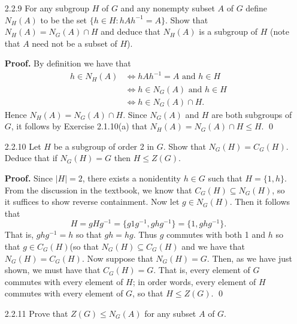 \begin{enumerate}
      \textbf{Proof.} Let $I_n = \{1, 2, \ldots, n\}$. Consider the action of
      $G$ on $I_n$, given by $\sigma \cdot a = \sigma(a)$, for each $\sigma \in
      G$ and $a \in I_n$. Since $1(i) = i$, it follows that $1 \in G_i$. So let
      $\alpha, \sigma \in G_i$. Since $\alpha(i) = \sigma(i) = i$ and since
      $\alpha$ and $\sigma$ are bijections, it follows that
      $\alpha^{-1}(i) = \sigma^{-1}(i) = i$.  Now we have that
      $$(\alpha\sigma^{-1})(i) = \alpha(\sigma^{-1}(i)) = \alpha(i) = i,$$
      so that $\alpha\sigma^{-1} \in G_i$. Conclude by the Subgroup Criterion
      that $G_i \le G$. \qed
   \item[2.2.9]   For any subgroup $H$ of $G$ and any nonempty subset $A$ of $G$
                  define $N_H(A)$ to be the set $\{h \in H : hAh^{-1} = A\}$.
                  Show that $N_H(A) = N_G(A) \cap H$ and deduce that $N_H(A)$ is
                  a subgroup of $H$ (note that $A$ need not be a subset of $H$).

      \textbf{Proof.} By definition we have that
      \begin{align*}
          h \in N_H(A) &\Longleftrightarrow hAh^{-1} = A \text{ and } h \in H \\
            &\Longleftrightarrow h \in N_G(A) \text{ and } h \in H\\
            &\Longleftrightarrow h \in N_G(A) \cap H.
      \end{align*}
      Hence $N_H(A) = N_G(A) \cap H$. Since $N_G(A)$ and $H$ are both subgroups
      of $G$, it follows by Exercise 2.1.10(a) that
      $N_H(A) = N_G(A) \cap H \le H$. \qed
   \item[2.2.10]  Let $H$ be a subgroup of order 2 in $G$. Show that
                  $N_G(H) = C_G(H)$. Deduce that if $N_G(H) = G$ then
                  $H \le Z(G)$.

      \textbf{Proof.} Since $|H| = 2$, there exists a nonidentity $h \in G$ such
      that $H = \{1, h\}$. From the discussion in the textbook, we know that
      $C_G(H) \subseteq N_G(H)$, so it suffices to show reverse containment. Now
      let $g \in N_G(H)$. Then it follows that
      $$H = gHg^{-1} = \{g1g^{-1}, ghg^{-1}\} = \{1, ghg^{-1}\}.$$
      That is, $ghg^{-1} = h$ so that $gh = hg$. Thus $g$ commutes with both 1
      and $h$ so that $g \in C_G(H)$(so that $N_G(H) \subseteq C_G(H)$ and we 
      have that $N_G(H) = C_G(H)$. Now suppose that $N_G(H) = G$. Then, as we
      have just shown, we must have that $C_G(H) = G$. That is, every element of
      $G$ commutes with every element of $H$; in order words, every element of
      $H$ commutes with every element of $G$, so that $H \le Z(G)$. \qed
   \item[2.2.11]  Prove that $Z(G) \le N_G(A)$ for any subset $A$ of $G$.


\end{enumerate}

